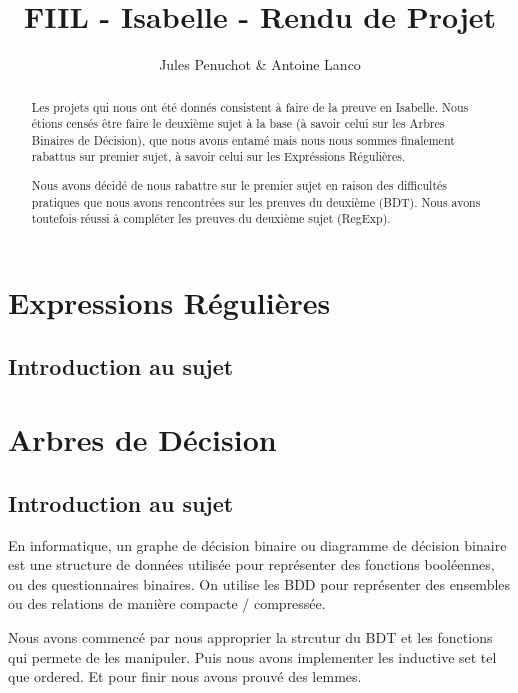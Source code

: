 \documentclass{article}
\title{FIIL - Isabelle - Rendu de Projet}
\author{Jules Penuchot \& Antoine Lanco}
\begin{document}
\maketitle

\begin{abstract}

Les projets qui nous ont été donnés consistent à faire de la preuve en Isabelle. Nous étions censés être faire le deuxième sujet à la base (à savoir celui sur les Arbres Binaires de Décision), que nous avons entamé mais nous nous sommes finalement rabattus sur premier sujet, à savoir celui sur les Expréssions Régulières.

Nous avons décidé de nous rabattre sur le premier sujet en raison des difficultés pratiques que nous avons rencontrées sur les preuves du deuxième (BDT). Nous avons toutefois réussi à compléter les preuves du deuxième sujet (RegExp).

\end{abstract}

\section{Expressions Régulières}

\subsection{Introduction au sujet}



\section{Arbres de Décision}

\subsection{Introduction au sujet}

En informatique, un graphe de décision binaire ou diagramme de décision binaire
est une structure de données utilisée pour représenter des fonctions booléennes,
ou des questionnaires binaires. On utilise les BDD pour représenter des
ensembles ou des relations de manière compacte / compressée.

Nous avons commencé par nous approprier la strcutur du BDT et les fonctions qui permete de les manipuler. Puis nous avons implementer les inductive set tel que
ordered. Et pour finir nous avons prouvé des lemmes.
\end{document}
